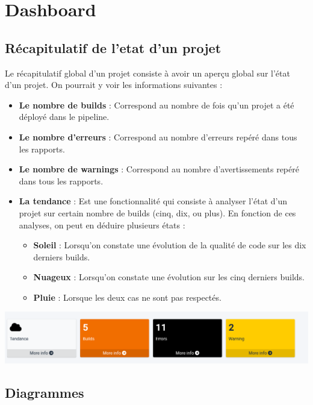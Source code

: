 	\section{Dashboard}
		\subsection{Récapitulatif de l'etat d'un projet}
			Le récapitulatif global d’un projet consiste à avoir un aperçu global sur l’état d’un projet. On pourrait y voir les informations suivantes :\\
			\begin{itemize}
				\item \textbf{Le nombre de builds} : Correspond au nombre de fois qu’un projet a été déployé dans le pipeline.
				\item \textbf{Le nombre d’erreurs} : Correspond au nombre d’erreurs repéré dans tous les rapports.
				\item \textbf{Le nombre de warnings} : Correspond au nombre d’avertissements repéré dans tous les rapports.
				\item  \textbf{La tendance} : Est une fonctionnalité qui consiste à analyser l’état d’un projet sur certain nombre de builds (cinq, dix, ou plus). En fonction de ces analyses, on peut en déduire plusieurs états : 
					\begin{itemize}
						\item \textbf{Soleil} : Lorsqu’on constate une évolution de la qualité de code sur les dix derniers builds.
						\item \textbf{Nuageux} : Lorsqu’on constate une évolution sur les cinq derniers builds.
						\item \textbf{Pluie} : Lorsque les deux cas ne sont pas respectés.
					\end{itemize}
			\end{itemize}
		\begin{center}
			\includegraphics[scale=0.4]{chap_3/recapt.png}
			\label{Recaptulatif}
		\end{center}
		\subsection{Diagrammes}
